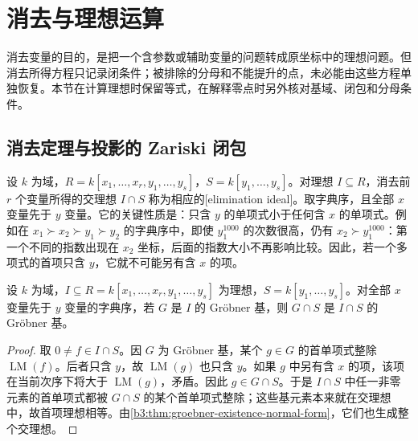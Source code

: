 
\section{消去与理想运算}
\label{b3:sec:0803}

消去变量的目的，是把一个含参数或辅助变量的问题转成原坐标中的理想问题。但消去所得方程只记录闭条件；被排除的分母和不能提升的点，未必能由这些方程单独恢复。本节在计算理想时保留等式，在解释零点时另外核对基域、闭包和分母条件。


\subsection{消去定理与投影的 Zariski 闭包}
\label{b3:subsec:0803:01}

设 \(k\) 为域，\(R=k[x_1,\ldots,x_r,y_1,\ldots,y_s]\)，\(S=k[y_1,\ldots,y_s]\)。对理想 \(I\subseteq R\)，消去前 \(r\) 个变量所得的交理想 \(I\cap S\) 称为相应的[elimination ideal]。取字典序，且全部 \(x\) 变量先于 \(y\) 变量。它的关键性质是：只含 \(y\) 的单项式小于任何含 \(x\) 的单项式。例如在 \(x_1\succ x_2\succ y_1\succ y_2\) 的字典序中，即使 \(y_1^{1000}\) 的次数很高，仍有 \(x_2\succ y_1^{1000}\)：第一个不同的指数出现在 \(x_2\) 坐标，后面的指数大小不再影响比较。因此，若一个多项式的首项只含 \(y\)，它就不可能另有含 \(x\) 的项。

\begin{theorem}[消去定理]\label{b3:thm:groebner-elimination}
	设 \(k\) 为域，\(I\subseteq R=k[x_1,\ldots,x_r,y_1,\ldots,y_s]\) 为理想，\(S=k[y_1,\ldots,y_s]\)。对全部 \(x\) 变量先于 \(y\) 变量的字典序，若 \(G\) 是 \(I\) 的 Gröbner 基，则 \(G\cap S\) 是 \(I\cap S\) 的 Gröbner 基。
\end{theorem}
\begin{proof}
	取 \(0\ne f\in I\cap S\)。因 \(G\) 为 Gröbner 基，某个 \(g\in G\) 的首单项式整除 \(\operatorname{LM}(f)\)。后者只含 \(y\)，故 \(\operatorname{LM}(g)\) 也只含 \(y\)。如果 \(g\) 中另有含 \(x\) 的项，该项在当前次序下将大于 \(\operatorname{LM}(g)\)，矛盾。因此 \(g\in G\cap S\)。于是 \(I\cap S\) 中任一非零元素的首单项式都被 \(G\cap S\) 的某个首单项式整除；这些基元素本来就在交理想中，故首项理想相等。由\cref{b3:thm:groebner-existence-normal-form}，它们也生成整个交理想。
\end{proof}

